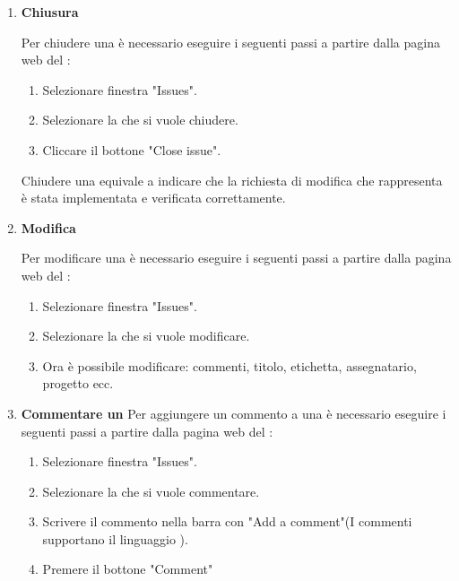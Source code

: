 \begin{enumerate}
    \item \textbf{Chiusura}
    
    Per chiudere una  è necessario eseguire i seguenti passi a partire dalla pagina web del :
    \begin{enumerate}
        \item Selezionare finestra "Issues".
        \item Selezionare la  che si vuole chiudere.
        \item Cliccare il bottone "Close issue".
    \end{enumerate}
    Chiudere una  equivale a indicare che la richiesta di modifica che rappresenta è stata implementata e verificata correttamente.

    \item \textbf{Modifica}
    
    Per modificare una  è necessario eseguire i seguenti passi a partire dalla pagina web del :
    \begin{enumerate}
        \item Selezionare finestra "Issues".
        \item Selezionare la  che si vuole modificare.
        \item Ora è possibile modificare: commenti, titolo, etichetta, assegnatario, progetto ecc.
    \end{enumerate}

    \item \textbf{Commentare un }
    \label{item:commentare_issue}
    Per aggiungere un commento a una  è necessario eseguire i seguenti passi a partire dalla pagina web del :
    \begin{enumerate}
        \item Selezionare finestra "Issues".
        \item Selezionare la  che si vuole commentare.
        \item Scrivere il commento nella barra con  "Add a comment"(I commenti supportano il linguaggio ).
        \item Premere il bottone "Comment"
    \end{enumerate}
\end{enumerate}

